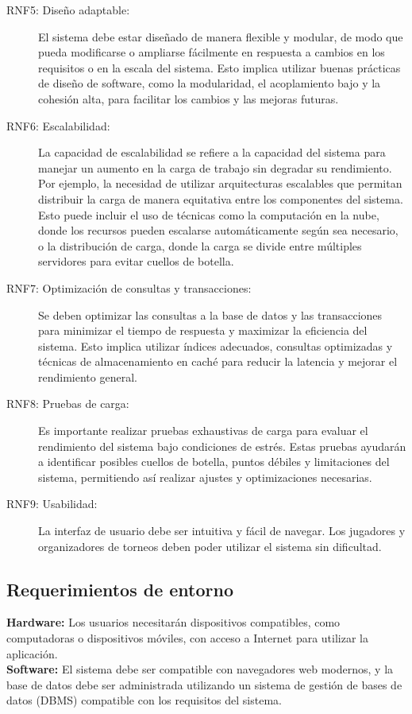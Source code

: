 \documentclass[a4paper]{article}
\begin{document}
\begin{description}
	\item[RNF5: Diseño adaptable:] El sistema debe estar diseñado de manera flexible y modular, de modo que pueda modificarse o ampliarse f\'acilmente en respuesta a cambios en los requisitos o en la escala del sistema. Esto implica utilizar buenas pr\'acticas de dise\~no de software, como la modularidad, el acoplamiento bajo y la cohesi\'on alta, para facilitar los cambios y las mejoras futuras.
	\item[RNF6: Escalabilidad:] La capacidad de escalabilidad se refiere a la capacidad del sistema para manejar un aumento en la carga de trabajo sin degradar su rendimiento. Por ejemplo, la necesidad de utilizar arquitecturas escalables que permitan distribuir la carga de manera equitativa entre los componentes del sistema. Esto puede incluir el uso de t\'ecnicas como la computaci\'on en la nube, donde los recursos pueden escalarse autom\'aticamente seg\'un sea necesario, o la distribuci\'on de carga, donde la carga se divide entre m\'ultiples servidores para evitar cuellos de botella.
	\item[RNF7: Optimización de consultas y transacciones:]  Se deben optimizar las consultas a la base de datos y las transacciones para minimizar el tiempo de respuesta y maximizar la eficiencia del sistema. Esto implica utilizar \'indices adecuados, consultas optimizadas y técnicas de almacenamiento en cach\'e para reducir la latencia y mejorar el rendimiento general.
	\item[RNF8: Pruebas de carga:] Es importante realizar pruebas exhaustivas de carga para evaluar el rendimiento del sistema bajo condiciones de estr\'es. Estas pruebas ayudar\'an a identificar posibles cuellos de botella, puntos d\'ebiles y limitaciones del sistema, permitiendo as\'i realizar ajustes y optimizaciones necesarias.    
    \item[RNF9: Usabilidad:] La interfaz de usuario debe ser intuitiva y fácil de navegar. Los jugadores y organizadores de torneos deben poder utilizar el sistema sin dificultad.
\end{description}

\subsection{Requerimientos de entorno}
\textbf{Hardware:} Los usuarios necesitarán dispositivos compatibles, como computadoras o dispositivos móviles, con acceso a Internet para utilizar la aplicación.\\
\textbf{Software:} El sistema debe ser compatible con navegadores web modernos, y la base de datos debe ser administrada utilizando un sistema de gestión de bases de datos (DBMS) compatible con los requisitos del sistema.
\newpage
\end{document}
